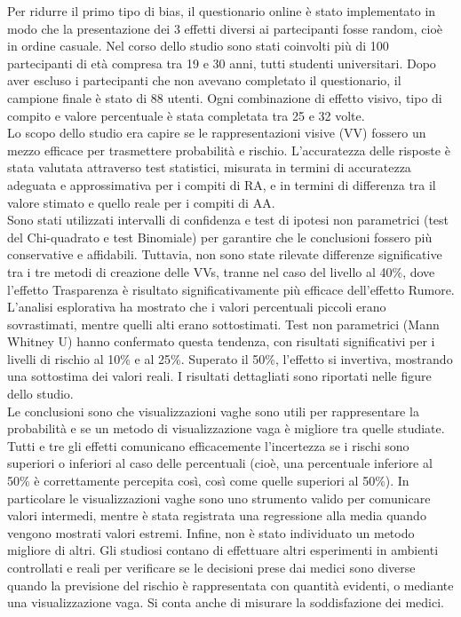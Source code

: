 Per ridurre il primo tipo di bias, il questionario online è stato implementato in modo che la presentazione dei 3 effetti diversi ai partecipanti fosse random, cioè in ordine casuale.
Nel corso dello studio sono stati coinvolti più di 100 partecipanti di età compresa tra 19 e 30 anni, tutti studenti universitari. Dopo aver escluso i partecipanti che non avevano completato il questionario, il campione finale è stato di 88 utenti. Ogni combinazione di effetto visivo, tipo di compito e valore percentuale è stata completata tra 25 e 32 volte.\\
Lo scopo dello studio era capire se le rappresentazioni visive (VV) fossero un mezzo efficace per trasmettere probabilità e rischio. L'accuratezza delle risposte è stata valutata attraverso test statistici, misurata in termini di accuratezza adeguata e approssimativa per i compiti di RA, e in termini di differenza tra il valore stimato e quello reale per i compiti di AA.\\
Sono stati utilizzati intervalli di confidenza e test di ipotesi non parametrici (test del Chi-quadrato e test Binomiale) per garantire che le conclusioni fossero più conservative e affidabili. Tuttavia, non sono state rilevate differenze significative tra i tre metodi di creazione delle VVs, tranne nel caso del livello al 40\%, dove l'effetto Trasparenza è risultato significativamente più efficace dell'effetto Rumore.\\
L'analisi esplorativa ha mostrato che i valori percentuali piccoli erano sovrastimati, mentre quelli alti erano sottostimati. Test non parametrici (Mann Whitney U) hanno confermato questa tendenza, con risultati significativi per i livelli di rischio al 10\% e al 25\%. Superato il 50\%, l'effetto si invertiva, mostrando una sottostima dei valori reali. I risultati dettagliati sono riportati nelle figure dello studio.\\

Le conclusioni sono che visualizzazioni vaghe sono utili per rappresentare la probabilità e se un metodo di visualizzazione vaga è migliore tra quelle studiate. Tutti e tre gli effetti  comunicano efficacemente l'incertezza se i rischi sono superiori o inferiori al caso delle percentuali (cioè, una percentuale inferiore al 50\% è correttamente percepita così, così come quelle superiori al 50\%). In particolare le visualizzazioni vaghe sono uno strumento valido per comunicare valori intermedi, mentre è stata registrata una regressione alla media quando vengono mostrati valori estremi.
Infine, non è stato individuato un metodo migliore di altri. Gli studiosi contano di effettuare altri esperimenti in ambienti controllati e reali per verificare se le decisioni prese dai medici sono diverse quando la previsione del rischio è rappresentata con quantità evidenti, o mediante una visualizzazione vaga. Si conta anche di misurare la soddisfazione dei medici.\\

